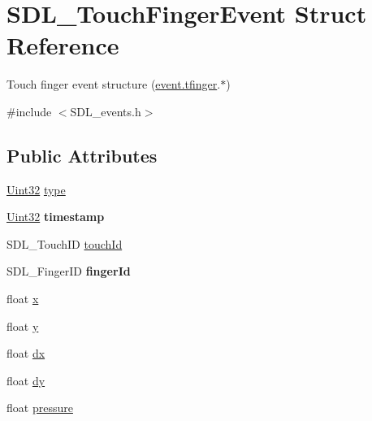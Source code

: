 \hypertarget{struct_s_d_l___touch_finger_event}{}\section{S\+D\+L\+\_\+\+Touch\+Finger\+Event Struct Reference}
\label{struct_s_d_l___touch_finger_event}


Touch finger event structure (\hyperlink{union_s_d_l___event_ab18d7d60794cb056948ffa58541bc3c5}{event.\+tfinger}.$\ast$)  




{\ttfamily \#include $<$S\+D\+L\+\_\+events.\+h$>$}

\subsection*{Public Attributes}
\begin{DoxyCompactItemize}
\item 
\hyperlink{_s_d_l__stdinc_8h_add440eff171ea5f55cb00c4a9ab8672d}{Uint32} \hyperlink{struct_s_d_l___touch_finger_event_a3883218fa3426065ca66086c100edbfa}{type}
\item 
\hypertarget{struct_s_d_l___touch_finger_event_abde2ab5cb013bbd21e37a65e2f8fa666}{}\hyperlink{_s_d_l__stdinc_8h_add440eff171ea5f55cb00c4a9ab8672d}{Uint32} {\bfseries timestamp}\label{struct_s_d_l___touch_finger_event_abde2ab5cb013bbd21e37a65e2f8fa666}

\item 
S\+D\+L\+\_\+\+Touch\+I\+D \hyperlink{struct_s_d_l___touch_finger_event_ad7a6f39ec9af1bf47b160d18314edd70}{touch\+Id}
\item 
\hypertarget{struct_s_d_l___touch_finger_event_a8616d46ed19906e3ee90a4d481d3a284}{}S\+D\+L\+\_\+\+Finger\+I\+D {\bfseries finger\+Id}\label{struct_s_d_l___touch_finger_event_a8616d46ed19906e3ee90a4d481d3a284}

\item 
float \hyperlink{struct_s_d_l___touch_finger_event_a0ce44b1342220fa17e9b9b4a77c2c906}{x}
\item 
float \hyperlink{struct_s_d_l___touch_finger_event_ac2bb8af638d2927a8e13f6ffe8f9384e}{y}
\item 
float \hyperlink{struct_s_d_l___touch_finger_event_ac6acac209d6e2bd659fdb6760081393d}{dx}
\item 
float \hyperlink{struct_s_d_l___touch_finger_event_a9c0320c5f18a6b9d10da657e166608c9}{dy}
\item 
float \hyperlink{struct_s_d_l___touch_finger_event_ab4fca822d0807b5748dbae8d3cc56524}{pressure}
\end{DoxyCompactItemize}



